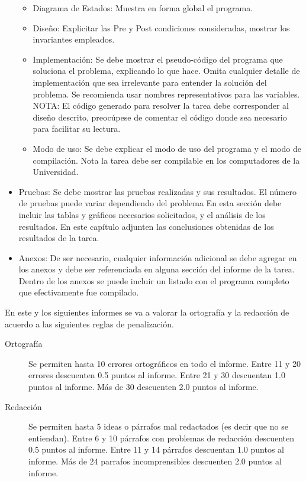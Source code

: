 \documentclass[11pt]{utalcaDoc}
\begin{document}
\begin{itemize}
\begin{itemize}
  \item Diagrama de Estados: Muestra en forma global el programa.
  
  \item Diseño: Explicitar las Pre y Post condiciones consideradas,
  mostrar los invariantes empleados.

  \item Implementación: Se debe mostrar el pseudo-código del programa que
  soluciona el problema, explicando lo que hace. Omita cualquier detalle de
  implementación que sea irrelevante para entender la solución del problema.
  Se recomienda usar nombres representativos para las variables.
  NOTA: El código generado para resolver la tarea debe corresponder al
  diseño descrito, preocúpese de comentar el código donde sea necesario
  para facilitar su lectura.
  
  \item Modo de uso: Se debe explicar el modo de uso del programa y el modo
  de compilación. Nota la tarea debe ser compilable en los computadores de la Universidad.
  \end{itemize}

\item Pruebas: Se debe mostrar las pruebas realizadas y sus resultados.
El número de pruebas puede variar dependiendo del problema
En esta sección debe incluir las tablas y gráficos necesarios solicitados,
y el análisis de los resultados. En este capítulo adjunten las conclusiones
obtenidas de los resultados de la tarea.

\item Anexos: De ser necesario, cualquier información adicional se debe
agregar en los anexos y debe ser referenciada en alguna sección del
informe de la tarea. Dentro de los anexos se puede incluir un listado con
el programa completo que efectivamente fue compilado.

\end{itemize}

En este y los siguientes informes se va a valorar la ortografía y la
redacción de acuerdo a las siguientes reglas de penalización.

\begin{description}
\item[Ortografía]
Se permiten hasta 10 errores ortográficos en todo el informe.
Entre 11 y 20 errores descuenten 0.5 puntos al informe.
Entre 21 y 30 descuentan 1.0 puntos al informe.
Más de 30 descuenten 2.0 puntos al informe.
\item[Redacción]
Se permiten hasta 5 ideas o párrafos mal redactados (es decir que no se entiendan).
Entre 6 y 10 párrafos con problemas de redacción descuenten 0.5 puntos al informe.
Entre 11 y 14 párrafos descuentan 1.0 puntos al informe.
Más de 24 parrafos incomprensibles descuenten 2.0 puntos al informe.
\end{description}
\end{document}
